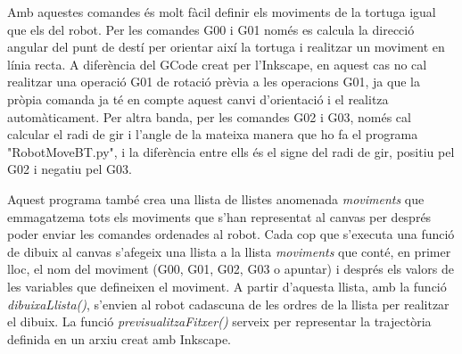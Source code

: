 Amb aquestes comandes és molt fàcil definir els moviments de la tortuga igual que els del robot. Per les comandes G00 i G01 només es calcula la direcció angular del punt de destí per orientar així la tortuga i realitzar un moviment en línia recta. A diferència del GCode creat per l'Inkscape, en aquest cas no cal realitzar una operació G01 de rotació prèvia a les operacions G01, ja que la pròpia comanda ja té en compte aquest canvi d'orientació i el realitza automàticament. Per altra banda, per les comandes G02 i G03, només cal calcular el radi de gir i l'angle de la mateixa manera que ho fa el programa "RobotMoveBT.py", i la diferència entre ells és el signe del radi de gir, positiu pel G02 i negatiu pel G03. 

Aquest programa també crea una llista de llistes anomenada \emph{moviments} que emmagatzema tots els moviments que s'han representat al canvas per després poder enviar les comandes ordenades al robot. Cada cop que s'executa una funció de dibuix al canvas s'afegeix una llista a la llista \emph{moviments} que conté, en primer lloc, el nom del moviment (G00, G01, G02, G03 o apuntar) i després els valors de les variables que defineixen el moviment. A partir d'aquesta llista, amb la funció \emph{dibuixaLlista()}, s'envien al robot cadascuna de les ordres de la llista per realitzar el dibuix. La funció \emph{previsualitzaFitxer()} serveix per representar la trajectòria definida en un arxiu creat amb Inkscape. 


